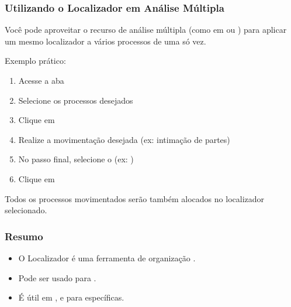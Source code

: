 \documentclass[letterpaper,10pt,brazil]{sphinxmanual}
\begin{document}
\subsubsection{Utilizando o Localizador em Análise Múltipla}
\label{\detokenize{projud_50_localizador:utilizando-o-localizador-em-analise-multipla}}
\sphinxAtStartPar
Você pode aproveitar o recurso de análise múltipla (como em  ou ) para aplicar um mesmo localizador a vários processos de uma só vez.

\sphinxAtStartPar
Exemplo prático:
\begin{enumerate}
%
\item {} 
\sphinxAtStartPar
Acesse a aba 

\item {} 
\sphinxAtStartPar
Selecione os processos desejados

\item {} 
\sphinxAtStartPar
Clique em 

\item {} 
\sphinxAtStartPar
Realize a movimentação desejada (ex: intimação de partes)

\item {} 
\sphinxAtStartPar
No passo final, selecione o  (ex: )

\item {} 
\sphinxAtStartPar
Clique em 

\end{enumerate}

\sphinxAtStartPar
Todos os processos movimentados serão também alocados no localizador selecionado.


\subsubsection{Resumo}
\label{\detokenize{projud_50_localizador:resumo}}\begin{itemize}
\item {} 
\sphinxAtStartPar
O Localizador é uma ferramenta de organização .

\item {} 
\sphinxAtStartPar
Pode ser usado para .

\item {} 
\sphinxAtStartPar
É útil em ,  e para  específicas.

\end{itemize}
\end{document}
